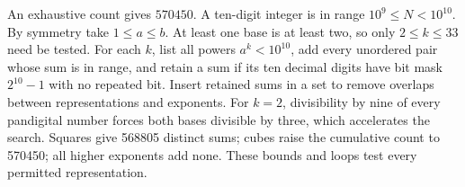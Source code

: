 An exhaustive count gives $\boxed{570450}$. A ten-digit integer is in range $10^9\le N<10^{10}$. By symmetry take $1\le a\le b$. At least one base is at least two, so only $2\le k\le33$ need be tested. For each $k$, list all powers $a^k<10^{10}$, add every unordered pair whose sum is in range, and retain a sum if its ten decimal digits have bit mask $2^{10}-1$ with no repeated bit. Insert retained sums in a set to remove overlaps between representations and exponents. For $k=2$, divisibility by nine of every pandigital number forces both bases divisible by three, which accelerates the search. Squares give 568805 distinct sums; cubes raise the cumulative count to 570450; all higher exponents add none. These bounds and loops test every permitted representation.
